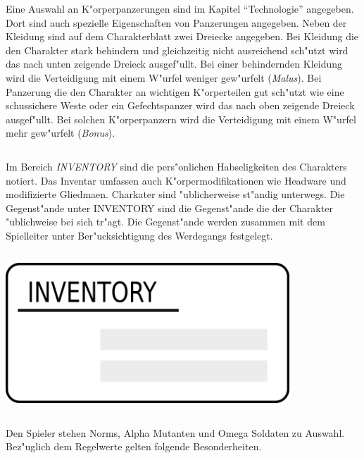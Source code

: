 Eine Auswahl an K"orperpanzerungen sind im Kapitel "`Technologie"' angegeben. Dort sind auch spezielle Eigenschaften von Panzerungen angegeben.  Neben der Kleidung sind auf dem Charakterblatt zwei Dreiecke angegeben. Bei Kleidung die den Charakter stark behindern und gleichzeitig nicht ausreichend sch"utzt wird das nach unten zeigende Dreieck ausgef"ullt. Bei einer behindernden Kleidung wird die Verteidigung mit einem W"urfel weniger gew"urfelt (\emph{Malus}). Bei Panzerung die den Charakter an wichtigen K"orperteilen gut sch"utzt wie eine schussichere Weste oder ein Gefechtspanzer wird das nach oben zeigende Dreieck ausgef"ullt. Bei solchen K"orperpanzern wird die Verteidigung mit einem W"urfel mehr gew"urfelt (\emph{Bonus}).

\begin{column}[l]{0.55}
    Im Bereich \emph{INVENTORY} sind die pers"onlichen Habseligkeiten des Charakters notiert. Das Inventar umfassen auch K"orpermodifikationen wie Headware und modifizierte Gliedma\3en. Charkater sind "ublicherweise st"andig unterwegs. Die Gegenst"ande unter INVENTORY sind die Gegenst"ande die der Charakter "ublichweise bei sich tr"agt. Die Gegenst"ande werden zusammen mit dem Spielleiter unter Ber"ucksichtigung des Werdegangs festgelegt.
\end{column}
\begin{column}[r]{0.45}
    \centering
    \includegraphics[width=0.80\textwidth]{images/character_inventory.png}
\end{column}
  

Den Spieler stehen Norms, Alpha Mutanten und Omega Soldaten zu Auswahl. Bez"uglich dem Regelwerte gelten folgende Besonderheiten.

